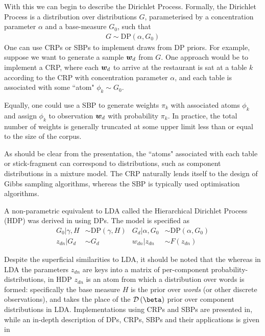 With this we can begin to describe the Dirichlet Process. Formally, the Dirichlet Process is a distribution over distributions $G$, parameterised by a concentration parameter $\alpha$ and a base-measure $G_0$, such that
\begin{align}
G \sim \text{DP}\left(\alpha, G_0\right)
\end{align}
One can use CRPs or SBPs to implement draws from DP priors. For example, suppose we want to generate a sample ${ \bm w_d }$ from $G$. One approach would be to implement a CRP\cite{Neal2000}, where each ${ \bm w_d }$ to arrive at the restaurant is sat at a table $k$ according to the CRP with concentration parameter $\alpha$, and each table is associated with some ``atom" $\phi_k \sim G_0$.

Equally, one could use a SBP\cite{Sethuraman1994} to generate weights $\pi_k$ with associated atoms $\phi_k$ and assign $\phi_k$ to observation ${ \bm w_d }$ with probability $\pi_k$. In practice, the total number of weights is generally truncated at some upper limit less than or equal to the size of the corpus. 

As should be clear from the presentation, the ``atoms" associated with each table or stick-fragment can correspond to distributions, such as component distributions in a mixture model. The CRP naturally lends itself to the design of Gibbs sampling algorithms, whereas the SBP is typically used optimisation algorithms. 

A non-parametric equivalent to LDA called the Hierarchical Dirichlet Process (HDP) was derived in \cite{Teh2006b} using DPs. The model is specified as
\begin{align}
G_0 | \gamma, H & \sim \text{DP}\left(\gamma, H \right) &
G_d | \alpha, G_0 & \sim \text{DP}\left(\alpha, G_0\right) \\
z_{dn} |G_d &\sim G_d & w_{dn} | z_{dn} & \sim F(z_{dn})
\end{align}

Despite the superficial similarities to LDA, it should be noted that the whereas in LDA the parameters $z_{dn}$ are keys into a matrix of per-component probability-distributions, in HDP $z_{dn}$ is an atom from which a distribution over words is formed: specifically the base measure $H$ is the prior over \emph{words} (or other discrete observations), and takes the place of the $\dir{\vv{\beta}}$ prior over component distributions in LDA. Implementations using CRPs and SBPs are presented in\cite{Teh2006b}, while an in-depth description of DPs, CRPs, SBPs and their applications is given in\cite{JordanMichael2005a}

